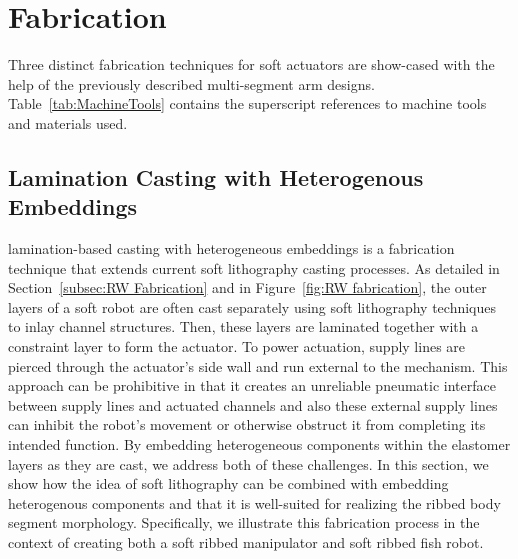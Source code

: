 \section{Fabrication}
\label{sec:Fabrication}
Three distinct fabrication techniques for soft actuators are show-cased with the help of the previously described multi-segment arm designs.
Table~\ref{tab:MachineTools} contains the superscript references to machine tools and materials used.

	
\subsection{Lamination Casting with Heterogenous Embeddings}
\label{subsec:Fabrication, Lamination Casting with Heterogenous Embeddings}
lamination-based casting with heterogeneous embeddings is a fabrication technique that extends current soft lithography casting processes.
%
As detailed in Section~\ref{subsec:RW Fabrication} and in Figure~\ref{fig:RW fabrication}, the outer layers of a soft robot are often cast separately using soft lithography techniques to inlay channel structures. Then, these layers are laminated together with a constraint layer to form the actuator.
%
To power actuation, supply lines are pierced through the actuator's side wall and run external to the mechanism.
%
This approach can be prohibitive in that it creates an unreliable pneumatic interface between supply lines and actuated channels and also these external supply lines can inhibit the robot's movement or otherwise obstruct it from completing its intended function.
%
By embedding heterogeneous components within the elastomer layers as they are cast, we address both of these challenges.
%
In this section, we show how the idea of soft lithography can be combined with embedding heterogenous components and that it is well-suited for realizing the ribbed body segment morphology.
%
Specifically, we illustrate this fabrication process in the context of creating both a soft ribbed manipulator and soft ribbed fish robot.

